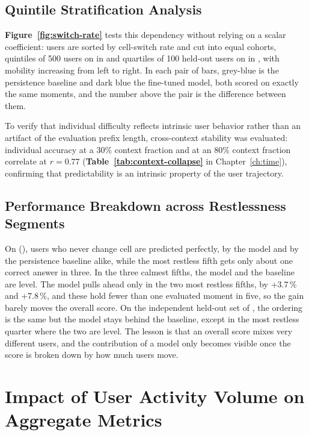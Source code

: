 \subsection{Quintile Stratification Analysis}

\textbf{Figure~\ref{fig:switch-rate}} tests this dependency without relying on a scalar coefficient: users are sorted by cell-switch rate and cut into equal cohorts, quintiles of 500 users on \Draw{} in \textbf{} and quartiles of 100 held-out users on \Dmob{} in \textbf{}, with mobility increasing from left to right. In each pair of bars, grey-blue is the persistence baseline and dark blue the fine-tuned model, both scored on exactly the same moments, and the number above the pair is the difference between them.



To verify that individual difficulty reflects intrinsic user behavior rather than an artifact of the evaluation prefix length, cross-context stability was evaluated: individual accuracy at a 30\% context fraction and at an 80\% context fraction correlate at $r = 0.77$ (\textbf{Table~\ref{tab:context-collapse}} in Chapter~\ref{ch:time}), confirming that predictability is an intrinsic property of the user trajectory.

\subsection{Performance Breakdown across Restlessness Segments}

On \Draw{} (\textbf{}), users who never change cell are predicted perfectly, by the model and by the persistence baseline alike, while the most restless fifth gets only about one correct answer in three. In the three calmest fifths, the model and the baseline are level. The model pulls ahead only in the two most restless fifths, by +3.7\,\% and +7.8\,\%, and these hold fewer than one evaluated moment in five, so the gain barely moves the overall score. On the independent held-out set of \textbf{}, the ordering is the same but the model stays behind the baseline, except in the most restless quarter where the two are level. The lesson is that an overall score mixes very different users, and the contribution of a model only becomes visible once the score is broken down by how much users move.

\section{Impact of User Activity Volume on Aggregate Metrics}

